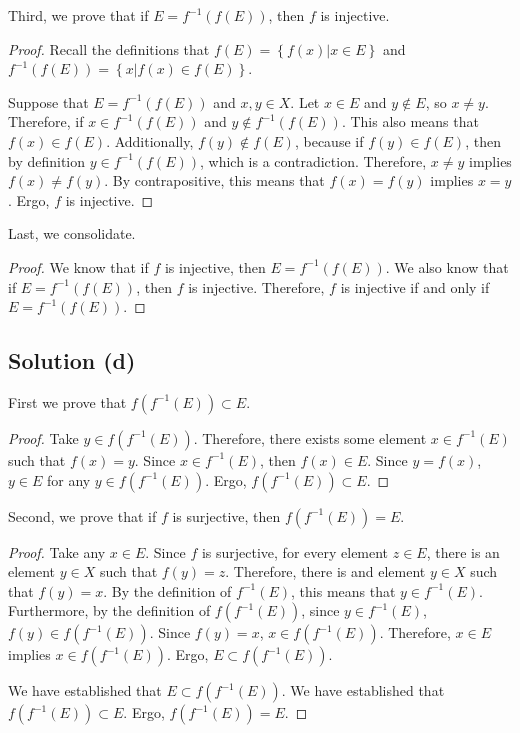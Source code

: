 \documentclass[11pt]{article}
\begin{document}
        Third, we prove that if $E = f^{-1}(f(E))$, then $f$ is injective.
        \begin{proof}
            Recall the definitions that $f(E) = \left\{f(x) \Big| x \in E\right\}$ and $f^{-1}(f(E)) = \left\{ x \Big| f(x) \in f(E) \right\}$.

            Suppose that $E = f^{-1}(f(E))$ and $x,y \in X$.
            Let $x \in E$ and $y \notin E$, so $x \neq y$.
            Therefore, if $x \in f^{-1}(f(E))$ and $y \notin f^{-1}(f(E))$.
            This also means that $f(x) \in f(E)$.
            Additionally, $f(y) \notin f(E)$, because if $f(y) \in f(E)$, then by definition $y \in f^{-1}(f(E))$, which is a contradiction.
            Therefore, $x \neq y$ implies $f(x) \neq f(y)$.
            By contrapositive, this means that $f(x) = f(y)$ implies $x = y$.
            Ergo, $f$ is injective.
        \end{proof}

        Last, we consolidate.
        \begin{proof}
            We know that if $f$ is injective, then $E = f^{-1}(f(E))$.
            We also know that if $E = f^{-1}(f(E))$, then $f$ is injective.
            Therefore, $f$ is injective if and only if $E = f^{-1}(f(E))$.
        \end{proof}

    \subsection{Solution (d)}
        First we prove that $f(f^{-1}(E)) \subset E$.
        \begin{proof}
            Take $y \in f(f^{-1}(E))$.
            Therefore, there exists some element $x \in f^{-1}(E)$ such that $f(x) = y$.
            Since $x \in f^{-1}(E)$, then $f(x) \in E$.
            Since $y = f(x)$, $y \in E$ for any $y \in f(f^{-1}(E))$.
            Ergo, $f(f^{-1}(E)) \subset E$.
        \end{proof}

        Second, we prove that if $f$ is surjective, then $f(f^{-1}(E)) = E$.
        \begin{proof}
            Take any $x \in E$.
            Since $f$ is surjective, for every element $z \in E$, there is an element $y \in X$ such that $f(y) = z$.
            Therefore, there is and element $y \in X$ such that $f(y) = x$.
            By the definition of $f^{-1}(E)$, this means that $y \in f^{-1}(E)$.
            Furthermore, by the definition of $f(f^{-1}(E))$, since $y \in f^{-1}(E)$, $f(y) \in f(f^{-1}(E))$.
            Since $f(y) = x$, $x \in f(f^{-1}(E))$.
            Therefore, $x \in E$ implies $x \in f(f^{-1}(E))$.
            Ergo, $E \subset f(f^{-1}(E))$.

            We have established that $E \subset f(f^{-1}(E))$.
            We have established that $f(f^{-1}(E)) \subset E$.
            Ergo, $f(f^{-1}(E)) = E$.
        \end{proof}
\end{document}
